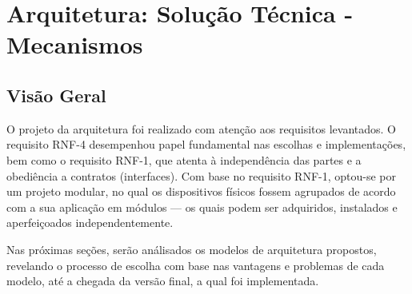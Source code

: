 \chapter{Arquitetura: Solução Técnica - Mecanismos}

\section{Visão Geral}

O projeto da arquitetura foi realizado com atenção aos requisitos levantados. O requisito RNF-4 desempenhou papel fundamental nas escolhas e implementações, bem como o requisito RNF-1, que atenta à independência das partes e a obediência a contratos (interfaces). Com base no requisito RNF-1, optou-se por um projeto modular, no qual os dispositivos físicos fossem agrupados de acordo com a sua aplicação em módulos --- os quais podem ser adquiridos, instalados e aperfeiçoados independentemente.

Nas próximas seções, serão análisados os modelos de arquitetura propostos, revelando o processo de escolha com base nas vantagens e problemas de cada modelo, até a chegada da versão final, a qual foi implementada.












